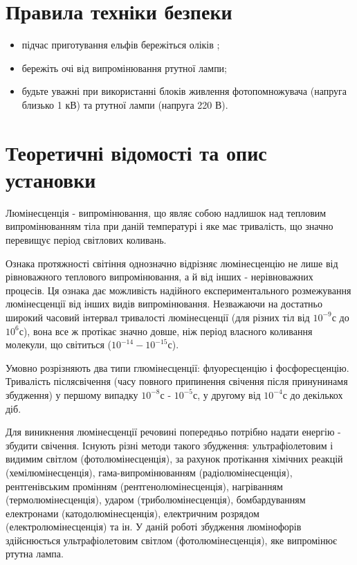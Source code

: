\documentclass[twocolumn]{el-author}
\begin{document}
\section{Правила техніки безпеки}

\begin{itemize}
	\item  підчас приготування ельфів бережіться оліків ;
	\item  бережіть очі від випромінювання ртутної лампи;
	\item  будьте уважні при використанні блоків живлення
фотопомножувача (напруга близько 1 кВ) та ртутної лампи
(напруга 220 В).
\end{itemize}

\section{Теоретичні відомості та опис установки}

Люмінесценція - випромінювання, що являє собою надлишок над
тепловим випромінюванням тіла при даній температурі і яке має тривалість,
що значно перевищує період світлових коливань.

Ознака протяжності світіння однозначно відрізняє люмінесценцію не
лише від рівноважного теплового випромінювання, а й від інших -
нерівноважних процесів. Ця ознака дає можливість надійного
експериментального розмежування люмінесценції від інших  видів
випромінювання. Незважаючи на достатньо широкий часовий інтервал
тривалості люмінесценції (для різних тіл від $10^{-9}$с до $10^{6}$с), вона все ж
протікає значно довше, ніж період власного коливання молекули, що
світиться ($10^{-14} - 10^{-15}$с).

Умовно розрізняють два типи глюмінесценції: флуоресценцію і
фосфоресценцію. Тривалість післясвічення (часу повного припинення
свічення після  принунинамя збудження) у першому випадку $10^{-8}$с - $10^{-5}$с, 
у другому від $10^{-4}$с до декількох діб.

Для виникнення люмінесценції речовині попередньо потрібно надати
енергію - збудити свічення. Існують різні методи такого збудження:
ультрафіолетовим і видимим світлом (фотолюмінесценція), за рахунок
протікання хімічних реакцій (хемілюмінесценція), гама-випромінюванням
(радіолюмінесценція), рентгенівським промінням (рентгенолюмінесценція), 
нагріванням (термолюмінесценція), ударом (триболюмінесценція),
бомбардуванням електронами (катодолюмінесценція), електричним розрядом
(електролюмінесценція) та ін. У даній роботі збудження люмінофорів
здійснюється ультрафіолетовим світлом  (фотолюмінесценція), яке
випромінює ртутна лампа.
\end{document}
